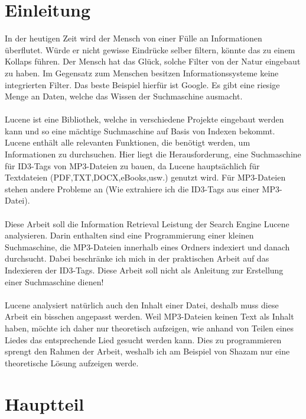 \documentclass[12pt,a4paper,ngerman]{report}
\begin{document}
\chapter{Einleitung}
In der heutigen Zeit wird der Mensch von einer Fülle an Informationen überflutet. Würde er nicht gewisse Eindrücke selber filtern, könnte das zu einem Kollaps führen. Der Mensch hat das Glück, solche Filter von der Natur eingebaut zu haben. Im Gegensatz zum Menschen besitzen Informationssysteme keine integrierten Filter. Das beste Beispiel hierfür ist Google. Es gibt eine riesige Menge an Daten, welche das Wissen der Suchmaschine ausmacht.
\\
\\
Lucene ist eine Bibliothek, welche in verschiedene Projekte eingebaut werden kann und so eine mächtige Suchmaschine auf Basis von Indexen bekommt. Lucene enthält alle relevanten Funktionen, die benötigt werden, um Informationen zu durchsuchen. Hier liegt die Herausforderung, eine Suchmaschine für ID3-Tags von MP3-Dateien zu bauen, da Lucene hauptsächlich für Textdateien (PDF,TXT,DOCX,eBooks,usw.) genutzt wird. Für MP3-Dateien stehen andere Probleme an (Wie extrahiere ich die ID3-Tags aus einer MP3-Datei). 
\\
\\
Diese Arbeit soll die Information Retrieval Leistung der Search Engine Lucene analysieren. Darin enthalten sind eine Programmierung einer kleinen Suchmaschine, die MP3-Dateien innerhalb eines Ordners indexiert und danach durchsucht. Dabei beschränke ich mich in der praktischen Arbeit auf das Indexieren der ID3-Tags. Diese Arbeit soll nicht als Anleitung zur Erstellung einer Suchmaschine dienen!
\\
\\
Lucene analysiert natürlich auch den Inhalt einer Datei, deshalb muss diese Arbeit ein bisschen angepasst werden. Weil MP3-Dateien keinen Text als Inhalt haben, möchte ich daher nur theoretisch aufzeigen, wie anhand von Teilen eines Liedes das entsprechende Lied gesucht werden kann. Dies zu programmieren sprengt den Rahmen der Arbeit, weshalb ich am Beispiel von Shazam nur eine theoretische Lösung aufzeigen werde.
\chapter{Hauptteil}
\end{document}
